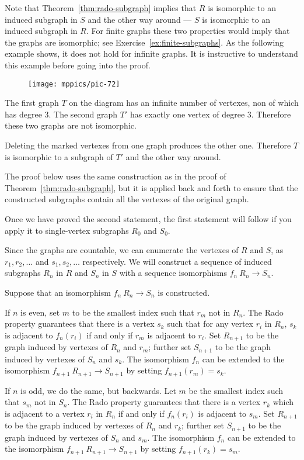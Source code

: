Note that Theorem~\ref{thm:rado-subgraph} implies that $R$ is isomorphic to an induced subgraph in $S$ and the other way around --- $S$ is isomorphic to an induced subgraph in $R$.
For finite graphs these two properties would imply that the graphs are isomorphic; see Exercise~\ref{ex:finite-subgraphs}.
As the following example shows, it does not hold for infinite graphs.
It is instructive to understand this example before going into the proof.

\begin{figure}[h!]%
\vskip-0mm
\centering
\texttt{[image: mppics/pic-72]}
\vskip-0mm
\end{figure}
 
The first graph $T$ on the diagram has an infinite number of vertexes, non of which has degree 3.
The second graph $T'$ has exactly one vertex of degree 3. 
Therefore these two graphs are not isomorphic.

Deleting the marked vertexes from one graph produces the other one. 
Therefore $T$ is isomorphic to a subgraph of $T'$ and the other way around.

The proof below uses the same construction as in the proof of Theorem~\ref{thm:rado-subgraph}, but it is applied back and forth to ensure that the constructed subgraphs contain all the vertexes of the original graph.


Once we have proved the second statement,
the first statement will follow if you apply it to single-vertex subgraphs $R_0$ and $S_0$.

Since the graphs are countable,
we can enumerate the vertexes of $R$ and $S$, as $r_1 , r_2 , \dots$ and $s_1, s_2,\dots$ respectively. 
We will construct a sequence of induced subgraphs $R_n$ in $R$ and $S_n$ in $S$ with a sequence isomorphisms $f_n\:R_n\to S_n$.

Suppose that an isomorphism $f_n\:R_n\to S_n$ is constructed. 

If $n$ is even, set $m$ to be the smallest index such that $r_m$ not in $R_n$.
The Rado property guarantees that there is a vertex $s_k$ such that for any vertex $r_i$ in $R_n$, $s_k$ is adjacent to $f_n(r_i)$ if and only if $r_m$ is adjacent to $r_i$.
Set $R_{n+1}$ to be the graph induced by vertexes of $R_n$ and $r_m$;
further set $S_{n+1}$ to be the graph induced by vertexes of $S_n$ and $s_k$.
The isomorphism $f_n$ can be extended to the isomorphism $f_{n+1}\:R_{n+1}\to S_{n+1}$ by
setting $f_{n+1}(r_m)=s_k$.  

If $n$ is odd, we do the same, but backwards.
Let $m$ be the smallest index such that $s_m$ not in $S_n$.
The Rado property guarantees that there is a vertex $r_k$ which is adjacent to a vertex $r_i$ in $R_n$ if and only if $f_n(r_i)$ is adjacent to $s_m$.
Set $R_{n+1}$ to be the graph induced by vertexes of $R_n$ and $r_k$;
further set $S_{n+1}$ to be the graph induced by vertexes of $S_n$ and $s_m$.
The isomorphism $f_n$ can be extended to the isomorphism $f_{n+1}\:R_{n+1}\to S_{n+1}$ by
setting $f_{n+1}(r_k)=s_m$.

